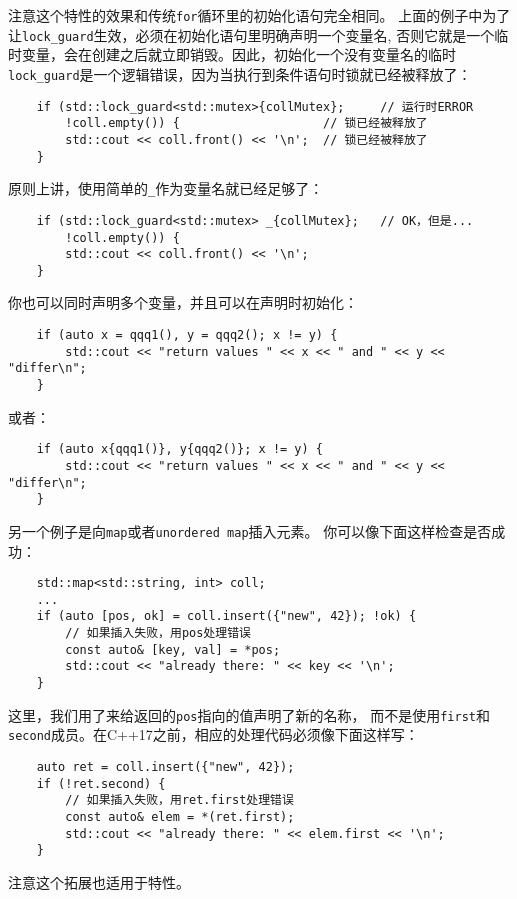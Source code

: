 注意这个特性的效果和传统\texttt{for}循环里的初始化语句完全相同。
上面的例子中为了让\texttt{lock\_guard}生效，必须在初始化语句里明确声明一个变量名,
否则它就是一个临时变量，会在创建之后就立即销毁。因此，初始化一个没有变量名的临时
\texttt{lock\_guard}是一个逻辑错误，因为当执行到条件语句时锁就已经被释放了：
\begin{lstlisting}
    if (std::lock_guard<std::mutex>{collMutex};     // 运行时ERROR
        !coll.empty()) {                    // 锁已经被释放了
        std::cout << coll.front() << '\n';  // 锁已经被释放了
    }
\end{lstlisting}
原则上讲，使用简单的\texttt{\_}作为变量名就已经足够了：
\begin{lstlisting}
    if (std::lock_guard<std::mutex> _{collMutex};   // OK，但是...
        !coll.empty()) {
        std::cout << coll.front() << '\n';
    }
\end{lstlisting}
你也可以同时声明多个变量，并且可以在声明时初始化：
\begin{lstlisting}
    if (auto x = qqq1(), y = qqq2(); x != y) {
        std::cout << "return values " << x << " and " << y << "differ\n";
    }
\end{lstlisting}
或者：
\begin{lstlisting}
    if (auto x{qqq1()}, y{qqq2()}; x != y) {
        std::cout << "return values " << x << " and " << y << "differ\n";
    }
\end{lstlisting}
另一个例子是向\texttt{map}或者\texttt{unordered map}插入元素。
你可以像下面这样检查是否成功：
\begin{lstlisting}
    std::map<std::string, int> coll;
    ...
    if (auto [pos, ok] = coll.insert({"new", 42}); !ok) {
        // 如果插入失败，用pos处理错误
        const auto& [key, val] = *pos;
        std::cout << "already there: " << key << '\n';
    }
\end{lstlisting}
这里，我们用了来给返回的\texttt{pos}指向的值声明了新的名称，
而不是使用\texttt{first}和\texttt{second}成员。在C++17之前，相应的处理代码必须像下面这样写：
\begin{lstlisting}
    auto ret = coll.insert({"new", 42});
    if (!ret.second) {
        // 如果插入失败，用ret.first处理错误
        const auto& elem = *(ret.first);
        std::cout << "already there: " << elem.first << '\n';
    }
\end{lstlisting}
注意这个拓展也适用于特性。

